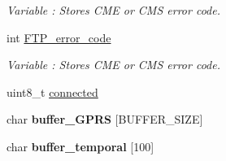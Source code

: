\begin{DoxyCompactItemize}
\begin{DoxyCompactList}\small\item\em Variable \+: Stores C\+ME or C\+MS error code. \end{DoxyCompactList}\item 
int \hyperlink{class_wasp_g_p_r_s___pro__core_a48c99ba69bf1fd4213733d5b528de353}{F\+T\+P\+\_\+error\+\_\+code}\hypertarget{class_wasp_g_p_r_s___pro__core_a48c99ba69bf1fd4213733d5b528de353}{}\label{class_wasp_g_p_r_s___pro__core_a48c99ba69bf1fd4213733d5b528de353}

\begin{DoxyCompactList}\small\item\em Variable \+: Stores C\+ME or C\+MS error code. \end{DoxyCompactList}\item 
uint8\+\_\+t \hyperlink{class_wasp_g_p_r_s___pro__core_ae43873d27e34f722254bac8c283d4d2b}{connected}
\item 
char {\bfseries buffer\+\_\+\+G\+P\+RS} \mbox{[}B\+U\+F\+F\+E\+R\+\_\+\+S\+I\+ZE\mbox{]}\hypertarget{class_wasp_g_p_r_s___pro__core_a54e37530cf07e2284457503640627245}{}\label{class_wasp_g_p_r_s___pro__core_a54e37530cf07e2284457503640627245}

\item 
char {\bfseries buffer\+\_\+temporal} \mbox{[}100\mbox{]}\hypertarget{class_wasp_g_p_r_s___pro__core_a0a3101e7e9c58baa1679fbb198213ed2}{}\label{class_wasp_g_p_r_s___pro__core_a0a3101e7e9c58baa1679fbb198213ed2}

\end{DoxyCompactItemize}
